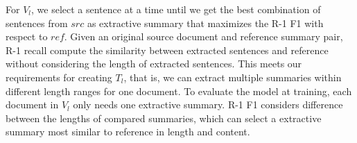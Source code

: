 For $V_{l}$, 
we select a sentence at a time until we get the best combination of sentences from $src$ as extractive summary that maximizes the R-1 F1 
with respect to $ref$. 
Given an original source document and reference summary pair, 
R-1 recall compute the similarity between extracted sentences and reference without considering the length of extracted sentences.
This meets our requirements for creating $T_{l}$, that is, we can extract multiple summaries within different length ranges for one document.
To evaluate the model at training,
each document in $V_l$ only needs one extractive summary.
R-1 F1 considers difference between the lengths of compared summaries, 
which can select a extractive summary most similar to reference in length and content.


